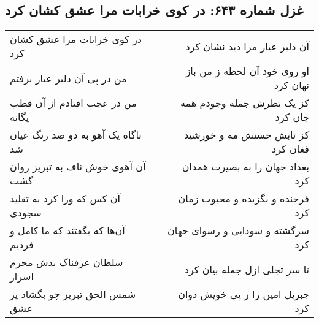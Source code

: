 \begin{center}
\section*{غزل شماره ۶۴۳: در کوی خرابات مرا عشق کشان کرد}
\label{sec:0643}
\begin{longtable}{l p{0.5cm} r}
در کوی خرابات مرا عشق کشان کرد
&&
آن دلبر عیار مرا دید نشان کرد
\\
من در پی آن دلبر عیار برفتم
&&
او روی خود آن لحظه ز من باز نهان کرد
\\
من در عجب افتادم از آن قطب یگانه
&&
کز یک نظرش جمله وجودم همه جان کرد
\\
ناگاه یک آهو به دو صد رنگ عیان شد
&&
کز تابش حسنش مه و خورشید فغان کرد
\\
آن آهوی خوش ناف به تبریز روان گشت
&&
بغداد جهان را به بصیرت همدان کرد
\\
آن کس که ورا کرد به تقلید سجودی
&&
فرخنده و بگزیده و محبوب زمان کرد
\\
آن‌ها که بگفتند که ما کامل و فردیم
&&
سرگشته و سودایی و رسوای جهان کرد
\\
سلطان عرفناک بدش محرم اسرار
&&
تا سر تجلی ازل جمله بیان کرد
\\
شمس الحق تبریز چو بگشاد پر عشق
&&
جبریل امین را ز پی خویش دوان کرد
\\
\end{longtable}
\end{center}
